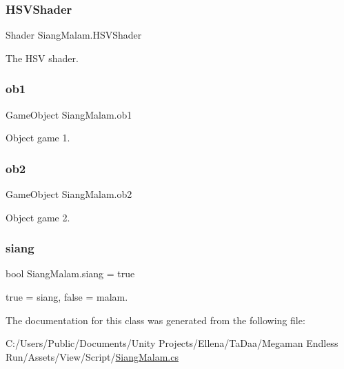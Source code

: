 \hypertarget{class_siang_malam_a0178556607a805c0d69f623512bb1bf5}{}\label{class_siang_malam_a0178556607a805c0d69f623512bb1bf5} 
\subsubsection{\texorpdfstring{H\+S\+V\+Shader}{HSVShader}}
{\footnotesize\ttfamily Shader Siang\+Malam.\+H\+S\+V\+Shader}



The H\+SV shader. 

\hypertarget{class_siang_malam_a28d5bb8091f1f0160959fce37bdafccd}{}\label{class_siang_malam_a28d5bb8091f1f0160959fce37bdafccd} 
\subsubsection{\texorpdfstring{ob1}{ob1}}
{\footnotesize\ttfamily Game\+Object Siang\+Malam.\+ob1}



Object game 1. 

\hypertarget{class_siang_malam_ac903e5559288c82b9767674461899742}{}\label{class_siang_malam_ac903e5559288c82b9767674461899742} 
\subsubsection{\texorpdfstring{ob2}{ob2}}
{\footnotesize\ttfamily Game\+Object Siang\+Malam.\+ob2}



Object game 2. 

\hypertarget{class_siang_malam_af85d640c6eebc35947063e0df9595794}{}\label{class_siang_malam_af85d640c6eebc35947063e0df9595794} 
\subsubsection{\texorpdfstring{siang}{siang}}
{\footnotesize\ttfamily bool Siang\+Malam.\+siang = true}



true = siang, false = malam. 



The documentation for this class was generated from the following file\+:\begin{DoxyCompactItemize}
\item 
C\+:/\+Users/\+Public/\+Documents/\+Unity Projects/\+Ellena/\+Ta\+Daa/\+Megaman Endless Run/\+Assets/\+View/\+Script/\hyperlink{_siang_malam_8cs}{Siang\+Malam.\+cs}\end{DoxyCompactItemize}
